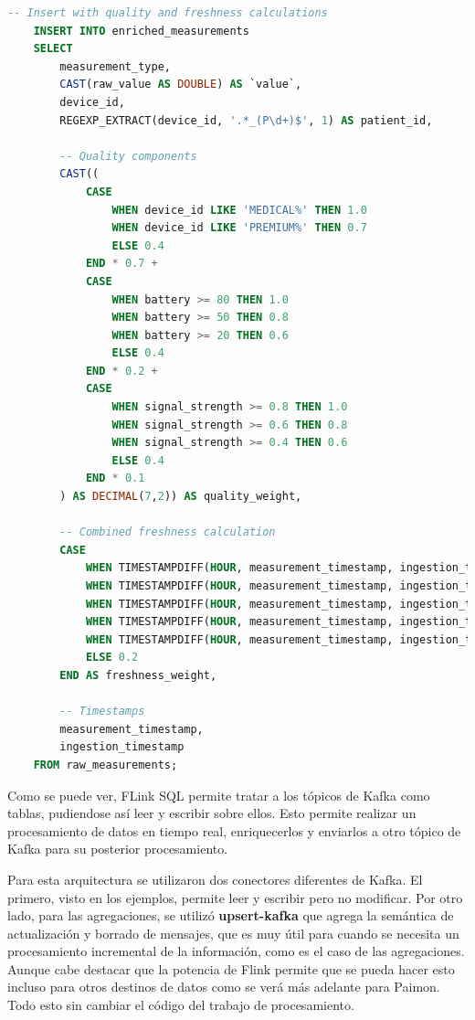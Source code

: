 \begin{lstlisting}[language=sql]
    -- Insert with quality and freshness calculations
    INSERT INTO enriched_measurements
    SELECT
        measurement_type,
        CAST(raw_value AS DOUBLE) AS `value`,
        device_id,
        REGEXP_EXTRACT(device_id, '.*_(P\d+)$', 1) AS patient_id,

        -- Quality components
        CAST((
            CASE
                WHEN device_id LIKE 'MEDICAL%' THEN 1.0
                WHEN device_id LIKE 'PREMIUM%' THEN 0.7
                ELSE 0.4
            END * 0.7 +
            CASE
                WHEN battery >= 80 THEN 1.0
                WHEN battery >= 50 THEN 0.8
                WHEN battery >= 20 THEN 0.6
                ELSE 0.4
            END * 0.2 +
            CASE
                WHEN signal_strength >= 0.8 THEN 1.0
                WHEN signal_strength >= 0.6 THEN 0.8
                WHEN signal_strength >= 0.4 THEN 0.6
                ELSE 0.4
            END * 0.1
        ) AS DECIMAL(7,2)) AS quality_weight,

        -- Combined freshness calculation
        CASE
            WHEN TIMESTAMPDIFF(HOUR, measurement_timestamp, ingestion_timestamp) <= 1 THEN 1.0
            WHEN TIMESTAMPDIFF(HOUR, measurement_timestamp, ingestion_timestamp) <= 6 THEN 0.9
            WHEN TIMESTAMPDIFF(HOUR, measurement_timestamp, ingestion_timestamp) <= 12 THEN 0.7
            WHEN TIMESTAMPDIFF(HOUR, measurement_timestamp, ingestion_timestamp) <= 24 THEN 0.5
            WHEN TIMESTAMPDIFF(HOUR, measurement_timestamp, ingestion_timestamp) <= 48 THEN 0.3
            ELSE 0.2
        END AS freshness_weight,
        
        -- Timestamps
        measurement_timestamp,
        ingestion_timestamp
    FROM raw_measurements;
\end{lstlisting}

Como se puede ver, FLink SQL permite tratar a los tópicos de Kafka como tablas, pudiendose así leer y escribir sobre ellos. 
Esto permite realizar un procesamiento de datos en tiempo real,
enriquecerlos y enviarlos a otro tópico de Kafka para su posterior procesamiento.

Para esta arquitectura se utilizaron dos conectores diferentes de Kafka. El primero, visto en los ejemplos, permite leer y escribir pero no modificar. 
Por otro lado, para las agregaciones, se utilizó \textbf{upsert-kafka} que agrega la semántica de actualización y borrado de mensajes,
que es muy útil para cuando se necesita un procesamiento incremental de la información, como es el caso de las agregaciones. 
Aunque cabe destacar que la potencia de Flink permite que se pueda hacer esto incluso para otros destinos de datos como se verá más adelante para Paimon.
Todo esto sin cambiar el código del trabajo de procesamiento. 

